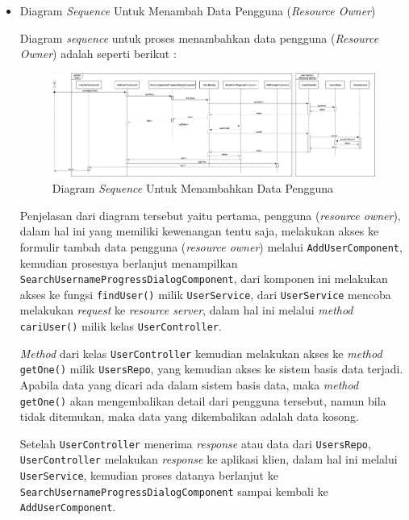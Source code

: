 \documentclass[pdftex,12pt, oneside]{article}
\begin{document}
\begin{itemize}
	\item Diagram \textit{Sequence} Untuk Menambah Data Pengguna (\textit{Resource Owner})
	
		Diagram \textit{sequence} untuk proses menambahkan data pengguna (\textit{Resource Owner}) adalah seperti berikut :
		
		\begin{figure}[H]
			\centering
			\includegraphics[width=1\textwidth]{./resources/seq-add-user}
			\caption{Diagram \textit{Sequence} Untuk Menambahkan Data Pengguna}
			\label{fig:seq-add-user}
		\end{figure}
		
		Penjelasan dari diagram tersebut yaitu pertama, pengguna (\textit{resource owner}), dalam hal ini yang memiliki kewenangan tentu saja, melakukan akses ke formulir tambah data pengguna (\textit{resource owner}) melalui \texttt{AddUserComponent}, kemudian prosesnya berlanjut menampilkan \texttt{SearchUsernameProgressDialogComponent}, dari komponen ini melakukan akses ke fungsi \texttt{findUser()} milik \texttt{UserService}, dari \texttt{UserService} mencoba melakukan \textit{request} ke \textit{resource server}, dalam hal ini melalui \textit{method} \texttt{cariUser()} milik kelas \texttt{UserController}.
		
		\textit{Method} dari kelas \texttt{UserController} kemudian melakukan akses ke \textit{method} \texttt{getOne()} milik \texttt{UsersRepo}, yang kemudian akses ke sistem basis data terjadi. Apabila data yang dicari ada dalam sistem basis data, maka \textit{method} \texttt{getOne()} akan mengembalikan detail dari pengguna tersebut, namun bila tidak ditemukan, maka data yang dikembalikan adalah data kosong.
		
		Setelah \texttt{UserController} menerima \textit{response} atau data dari \texttt{UsersRepo}, \texttt{UserController} melakukan \textit{response} ke aplikasi klien, dalam hal ini melalui \texttt{UserService}, kemudian proses datanya berlanjut ke \texttt{SearchUsernameProgressDialogComponent} sampai kembali ke \texttt{AddUserComponent}.
		

\end{itemize}
\end{document}
